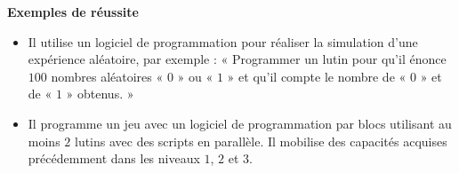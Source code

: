 \documentclass[10pt]{article}
\newcommand{\LR}{\begin{tikzpicture} \draw[BleuRoi,fill=BleuRoi] (0.05,0) -- (0,0.075) -- (-0.05,0) -- (0,-0.075) --cycle; \end{tikzpicture}}
\newenvironment{exemplesreussite}{%
    \renewcommand{\labelitemi}{\LR}%
    \renewcommand{\labelitemii}{-}%
    \color{black}%
    \par\textbf{Exemples de réussite}
    \begin{itemize}
    \setlength{\itemsep}{-0.2em}%
}{
    \end{itemize}
}
\begin{document}
\begin{exemplesreussite}
        \item Il utilise un logiciel de programmation pour réaliser la simulation d’une expérience aléatoire, par exemple : « Programmer un lutin pour qu’il énonce $100$ nombres aléatoires « $0$ » ou « $1$ » et qu’il compte le nombre de « $0$ » et de « $1$ » obtenus. »
        \item Il programme un jeu avec un logiciel de programmation par blocs utilisant au moins $2$ lutins avec des scripts en parallèle. Il mobilise des capacités acquises précédemment dans les niveaux $1$, $2$ et $3$.
    \end{exemplesreussite}
\end{document}

